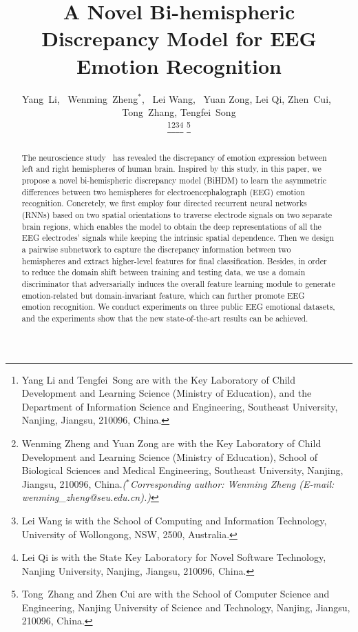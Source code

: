 \documentclass[journal]{IEEEtran}
\begin{document}
\title{A Novel Bi-hemispheric Discrepancy Model for EEG Emotion Recognition}

\author{Yang~Li,~
	Wenming~Zheng$^*$,~
Lei Wang,~
Yuan Zong,
Lei Qi,
Zhen~Cui,~
Tong~Zhang,
Tengfei~Song


\thanks{Yang Li and Tengfei~Song are with the Key Laboratory of Child Development and Learning Science (Ministry of Education), and the Department of Information Science and Engineering, Southeast University, Nanjing, Jiangsu, 210096, China. \protect}\thanks{Wenming Zheng and Yuan Zong are with the Key Laboratory of Child Development and Learning Science (Ministry of Education), School of Biological Sciences and Medical Engineering,
Southeast University, Nanjing, Jiangsu, 210096, China.\protect \it{($^*$Corresponding author: Wenming Zheng (E-mail: wenming\_zheng@seu.edu.cn).)}}\thanks{Lei Wang is with the School of Computing and Information Technology, University of Wollongong, NSW, 2500, Australia.\protect}\thanks{Lei Qi is with the State Key Laboratory for Novel Software Technology, Nanjing University, Nanjing, Jiangsu, 210096, China.}
\thanks{Tong~Zhang and Zhen Cui are with the School of Computer Science and Engineering, Nanjing University of Science and Technology, Nanjing, Jiangsu, 210096, China.\protect}
}



\maketitle
\begin{abstract}
	The neuroscience study~\cite{dimond1976differing} has revealed the discrepancy of emotion expression between left and right hemispheres of human brain. Inspired by this study, in this paper, we propose a novel bi-hemispheric discrepancy model (BiHDM) to learn the asymmetric differences between two hemispheres for electroencephalograph (EEG) emotion recognition. Concretely, we first employ four directed recurrent neural networks (RNNs) based on two spatial orientations to traverse electrode signals on two separate brain regions, which enables the model to obtain the deep representations of all the EEG electrodes' signals while keeping the intrinsic spatial dependence. Then we design a pairwise subnetwork to capture the discrepancy information between two hemispheres and extract higher-level features for final classification. Besides, in order to reduce the domain shift between training and testing data, we use a domain discriminator that adversarially induces the overall feature learning module to generate emotion-related but domain-invariant feature, which can further promote EEG emotion recognition. We conduct experiments on three public EEG emotional datasets, and the experiments show that the new state-of-the-art results can be achieved.
\end{abstract}
\end{document}
